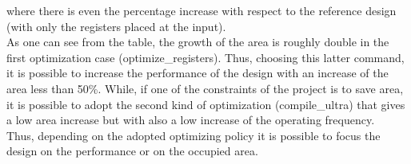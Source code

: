 \documentclass[a4paper, titlepage]{article}
\begin{document}
where there is even the percentage increase with respect to the 
reference design (with only the registers placed at the input).\\
As one can see from the table, the growth of the area is roughly double in the first optimization case (optimize\_registers). Thus, choosing this latter command, it is possible to increase the performance of the design with an increase of the area less than 50\%. While, if one of the constraints 
of the project is to save area, it is possible to adopt the second kind of optimization (compile\_ultra) that gives a low area increase but with also a low increase
of the operating frequency.
\\
Thus, depending on the adopted optimizing policy it is possible to focus the design on the performance or on the occupied area.
\newpage
\end{document}
